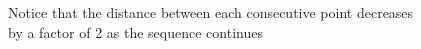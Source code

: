 \documentclass[preview]{standalone}
\begin{document}
\begin{center}
Notice that the distance between each consecutive point decreases\\by a factor of 2 as the sequence continues
\end{center}
\end{document}
